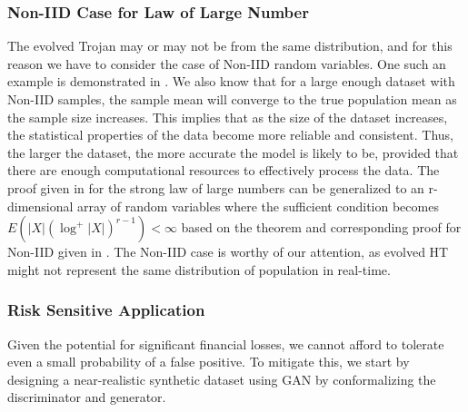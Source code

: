 \documentclass[9pt,conference]{IEEEtran}
\newtheorem{theorem}{Theorem}
\begin{document}
\subsubsection{Non-IID Case for Law of Large Number} The evolved Trojan may or may not be from the same distribution, and for this reason we have to consider the case of Non-IID random variables. One such an example is demonstrated in \cite{yonetani2019decentralized}. We also know that for a large enough dataset with Non-IID samples, the sample mean will converge to the true population mean as the sample size increases. This implies that as the size of the dataset increases, the statistical properties of the data become more reliable and consistent. Thus, the larger the dataset, the more accurate the model is likely to be, provided that there are enough computational resources to effectively process the data. The proof given in \cite{etemadi1981elementary} for the strong law of large numbers can be generalized to an r-dimensional array of random variables where the sufficient condition becomes $E\left(|X|\left(\log ^{+}|X|\right)^{r-1}\right)<\infty$ based on the theorem and corresponding proof for Non-IID given in \cite{smythe1973strong}. The Non-IID case is worthy of our attention, as evolved HT might not represent the same distribution of population in real-time.

\iffalse 

\begin{theorem}
\label{llm}
The strong law of large numbers for Non-IID random variables states that, if $X_1, X_2, \ldots, X_n$ are a sequence of non-identically distributed random variables with finite means $\mu_1, \mu_2, \ldots, \mu_n$, then for any $\epsilon > 0$,

\begin{equation*}
\mathbb{P} \left( \lim_{n \to \infty} \frac{1}{n} \sum_{i=1}^n (X_i - \mu_i) = 0 \right) = 1 - \sum_{i=1}^n \frac{\mathrm{Var}(X_i)}{n^2 \epsilon^2}.
\end{equation*}

Here, $\mathrm{Var}(X_i)$ denotes the variance of the $i$-th random variable $X_i$.
\end{theorem}

\fi 


\subsubsection{Risk Sensitive Application} Given the potential for significant financial losses, we cannot afford to tolerate even a small probability of a false positive. To mitigate this, we start by designing a near-realistic synthetic dataset using GAN by conformalizing the discriminator and generator. 
\end{document}
